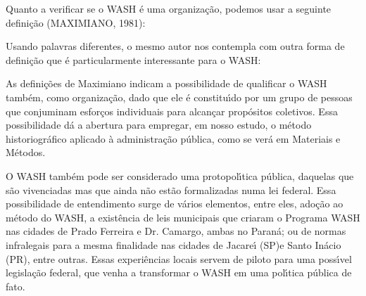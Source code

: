 \documentclass[
12pt,		%
openright,	%
twoside,  %
a4paper,			%
chapter=TITLE,		%
english,			%
french,				%
spanish,			%
brazil				%
]{USPSC-classe/USPSC}
\begin{document}
Quanto a verificar se o WASH \'e uma organiza\c{c}\~ao, podemos usar a seguinte defini\c{c}\~ao (MAXIMIANO, 1981):










\noindent\begin{center}\mbox{\centering{}}\end{center}


Usando palavras diferentes, o mesmo autor nos contempla com outra forma de defini\c{c}\~ao que \'e particularmente interessante para o WASH:










\noindent\begin{center}\mbox{\centering{}}\end{center}


As defini\c{c}\~oes de Maximiano indicam a possibilidade de qualificar o WASH tamb\'em, como organiza\c{c}\~ao, dado que ele \'e constitu\'{\i}do por um grupo de pessoas que conjuminam esfor\c{c}os individuais para alcan\c{c}ar prop\'ositos coletivos. Essa possibilidade d\'a a abertura para empregar, em nosso estudo, o m\'etodo historiogr\'afico aplicado \`a administra\c{c}\~ao p\'ublica, como se ver\'a em Materiais e M\'etodos.









O WASH tamb\'em pode ser considerado uma protopol\'{\i}tica p\'ublica, daquelas que s\~ao vivenciadas mas que ainda n\~ao est\~ao formalizadas numa lei federal. Essa possibilidade de entendimento surge de v\'arios elementos, entre eles, ado\c{c}\~ao ao m\'etodo do WASH, a exist\^encia de leis municipais que criaram o Programa WASH nas cidades de Prado Ferreira e Dr. Camargo, ambas no Paran\'a; ou de normas infralegais para a mesma finalidade nas cidades de Jacare\'{\i} (SP)e Santo In\'acio (PR), entre outras. Essas experi\^encias locais servem de piloto para uma poss\'{\i}vel legisla\c{c}\~ao federal, que venha a transformar o WASH em uma pol\'{\i}tica p\'ublica de fato.
\end{document}
